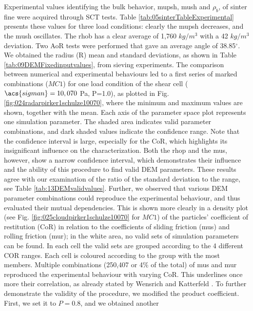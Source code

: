 Experimental values identifying the bulk behavior, \acs{mupsh}, \acs{mush} and $\rho_{b}$, 
of sinter fine were acquired through \acs{SCT} tests. 
Table \ref{tab:05sinterTableExperimental} presents
these values for three load conditions: clearly the \acs{mupsh} decreases, and 
the \acs{mush} oscillates.
The \acs{rhob} has a clear average of 1,760 $kg/m^3$ with a 42 
$kg/m^3$ deviation.
Two \acs{AoR} tests were performed that gave an average angle of
38.85$^\circ$.
We obtained the radius (\acs{R}) mean and standard
deviations, as shown in Table
\ref{tab:09DEMFixedinputvalues}, from sieving experiments.
The comparison between numerical and experimental behaviours led to a first
series of marked combinations ($MC1$) for one load condition of
the shear cell ($\acs{sigman} = 10,070$ Pa, P=1.0), as plotted in Fig.
\ref{fig:024radarpirker1schulze10070}, where 
the minimum and maximum values are shown, together with the mean. 
Each axis of the parameter space plot represents one simulation parameter.
The shaded area indicates valid parameter combinations, and dark shaded
values indicate the confidence range.
Note that the confidence interval is large, 
especially for the \acs{CoR}, which highlights its insignificant influence on the
characterization.
Both the \acs{rhop}  and the \acs{mus}, however, show a narrow confidence interval, 
which demonstrates their influence and the ability of this procedure to find
valid \acs{DEM} parameters.
These results agree with our examination of the ratio of the standard deviation
to the range, see Table \ref{tab:13DEMvalidvalues}.
Further, we observed that various \acs{DEM} parameter
combinations could reproduce the experimental behaviour, and thus evaluated
their mutual dependencies.
This is shown more clearly in a density plot (see Fig. 
\ref{fig:025cloudpirker1schulze10070} for $MC1$) 
of the particles' coefficient of restitution (\acs{CoR}) in relation to
the coefficients of sliding friction (\acs{mus}) and rolling friction (\acs{mur}); 
in the white area, no valid sets of simulation parameters can be found.
In each cell the valid sets are grouped according to the 4 different COR
ranges.
Each cell is coloured according to the group with the most members.
Multiple
combinations (250,407 or 4\% of the total) of \acs{mus} and \acs{mur} reproduced
the experimental behaviour with varying \acs{CoR}.
This underlines once more their correlation, as already stated by Wensrich and 
Katterfeld \cite{RefWorks:87}.
To further demonstrate the validity of the procedure, we modified the product
coefficient. 
First, we set it to $P=0.8$, and we obtained another
